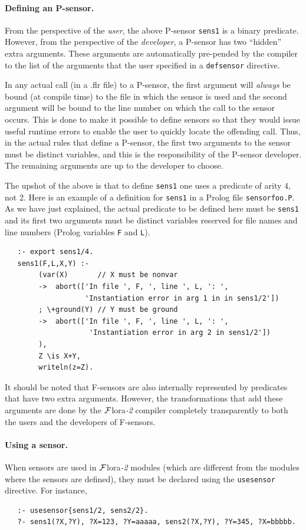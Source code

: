 \documentclass[11pt]{article}
\newcommand{\FLORA}{{\mbox{\sc ${\cal F}${lora}\rm\emph{-2}}}\xspace}
\newcommand{\FLSYSTEM}{\FLORA}
\newcommand{\flrext}{flr\xspace}
\begin{document}
\paragraph{Defining an P-sensor.}
From the perspective of the \emph{user}, the above P-sensor
\texttt{sens1} is
a binary predicate. However, 
from the perspective of the \emph{developer}, a P-sensor has two
``hidden'' extra arguments. These arguments 
are automatically pre-pended by the compiler to the list of the arguments
that the user specified in a \texttt{defsensor} directive. 

In any actual call (in a .\flrext file) to a P-sensor, the first argument will
\emph{always} be bound (at compile time) to the
file in which the sensor is used and the second 
argument will be bound to the line number
on which the call to the sensor occurs.
This is done to make it possible to define sensors so that they
would issue useful runtime errors to
enable the user to quickly locate the offending call. 
Thus, in the actual rules that define a P-sensor,
the first two arguments to the sensor must be distinct variables, and this
is the responsibility of the P-sensor developer.
The remaining arguments are up to the developer to choose.

The upshot of the above is that
to define \texttt{sens1} one uses
a predicate of arity 4, not 2.  
Here is an example of a definition for \texttt{sens1} in a Prolog file
\texttt{sensorfoo.P}. As we have just
explained, the actual predicate to be defined here must be \texttt{sens1}
and its first two arguments must be distinct variables 
reserved for file names and line numbers
(Prolog variables \texttt{F} and \texttt{L}).  
\begin{verbatim}
   :- export sens1/4.
   sens1(F,L,X,Y) :-
        (var(X)       // X must be nonvar
        ->  abort(['In file ', F, ', line ', L, ': ',
                   'Instantiation error in arg 1 in in sens1/2'])
        ; \+ground(Y) // Y must be ground
        ->  abort(['In file ', F, ', line ', L, ': ',
                    'Instantiation error in arg 2 in sens1/2'])
        ),
        Z \is X+Y,
        writeln(z=Z).
\end{verbatim}

It should be noted that F-sensors are also internally represented by
predicates that have two extra arguments. However, the transformations that
add these arguments are done by the \FLSYSTEM compiler completely
transparently to both the users and the developers of F-sensors.

\paragraph{Using a sensor.}
When sensors are
used in \FLSYSTEM modules (which are different from the modules where the
sensors are defined), they must be declared using the
\texttt{usesensor} directive.  For instance,
\begin{verbatim}
   :- usesensor{sens1/2, sens2/2}.
   ?- sens1(?X,?Y), ?X=123, ?Y=aaaaa, sens2(?X,?Y), ?Y=345, ?X=bbbbb.
\end{verbatim}
\end{document}
